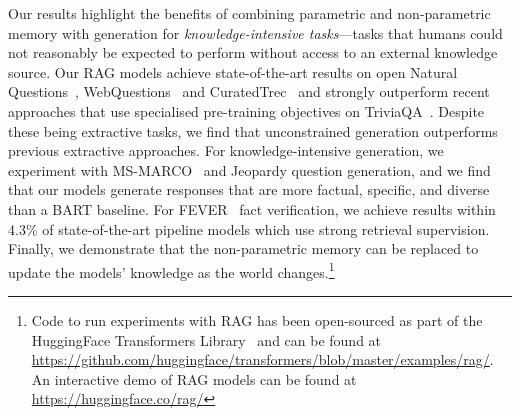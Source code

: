 Our results highlight the benefits of combining  parametric and non-parametric memory with generation for \emph{knowledge-intensive tasks}---tasks that humans could not reasonably be expected to perform without access to an external knowledge source. 
Our RAG models achieve state-of-the-art results on open Natural Questions~\cite{kwiatkowski_natural_2019}, WebQuestions~\cite{berant_semantic_2013} and CuratedTrec~\cite{baudivs2015modeling} and strongly outperform recent approaches that use specialised pre-training objectives on TriviaQA~\cite{joshi_triviaqa:_2017}. Despite these being extractive tasks, we find that unconstrained generation outperforms previous extractive approaches. For knowledge-intensive generation, we experiment with MS-MARCO~\cite{bajaj_ms_2016} and Jeopardy question generation, and we find that our models generate responses that are more factual, specific, and diverse than a BART baseline. For FEVER~\cite{thorne-etal-2018-fever} fact verification, we achieve results within 4.3\% of state-of-the-art pipeline models which use strong retrieval supervision.
Finally, we demonstrate that the non-parametric memory can be replaced
to update the models' knowledge as the world changes.\footnote{Code to run experiments with RAG has been open-sourced as part of the HuggingFace Transformers Library~\cite{Wolf2019HuggingFacesTS} and can be found at \url{https://github.com/huggingface/transformers/blob/master/examples/rag/}. An interactive demo of RAG models can be found at \url{https://huggingface.co/rag/}}

